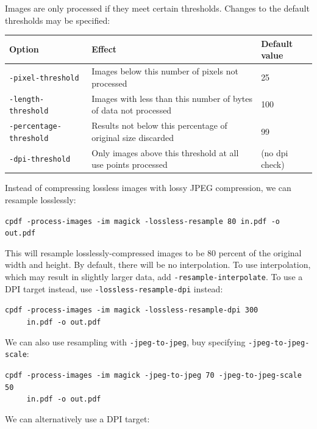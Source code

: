 \documentclass{book}
\begin{document}
\noindent Images are only processed if they meet certain thresholds. Changes to the default thresholds may be specified:

\bigskip
\begin{tabular}{lp{6cm}l}
Option & Effect & Default value\\\hline
{\small\texttt{-pixel-threshold}} & Images below this number of pixels not processed & 25 \\
{\small\texttt{-length-threshold}} & Images with less than this number of bytes of data not processed & 100 \\
{\small\texttt{-percentage-threshold}} & Results not below this percentage of original size discarded & 99 \\
{\small\texttt{-dpi-threshold}} & Only images above this threshold at all use points processed & (no dpi check)
\end{tabular}
\bigskip

\noindent Instead of compressing lossless images with lossy JPEG compression, we can resample losslessly:

  \begin{framed}
  \noindent\small\verb!cpdf -process-images -im magick -lossless-resample 80 in.pdf -o out.pdf!
  \end{framed}

\noindent This will resample losslessly-compressed images to be 80 percent of the original width and height. By default, there will be no interpolation. To use interpolation, which may result in slightly larger data, add \texttt{-resample-interpolate}. To use a DPI target instead, use \texttt{-lossless-resample-dpi} instead:

  \begin{framed}
  \noindent\small\verb!cpdf -process-images -im magick -lossless-resample-dpi 300!\\
  \noindent\small\verb!     in.pdf -o out.pdf!
  \end{framed}

\noindent We can also use resampling with \texttt{-jpeg-to-jpeg}, buy specifying \texttt{-jpeg-to-jpeg-scale}:

  \begin{framed}
  \noindent\small\verb!cpdf -process-images -im magick -jpeg-to-jpeg 70 -jpeg-to-jpeg-scale 50!\\
  \noindent\small\verb!     in.pdf -o out.pdf!
  \end{framed}

\noindent We can alternatively use a DPI target:
\end{document}
